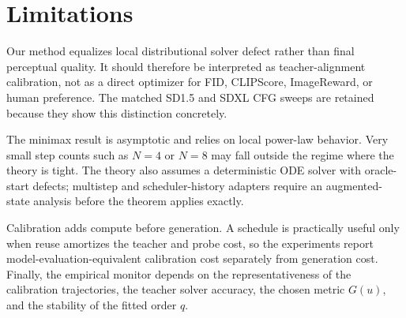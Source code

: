 \section{Limitations}
\label{sec:limitations}

Our method equalizes local distributional solver defect rather than final
perceptual quality. It should therefore be interpreted as
teacher-alignment calibration, not as a direct optimizer for FID, CLIPScore,
ImageReward, or human preference. The matched SD1.5 and SDXL CFG sweeps are
retained because they show this distinction concretely.

The minimax result is asymptotic and relies on local power-law behavior. Very
small step counts such as $N=4$ or $N=8$ may fall outside the regime where the
theory is tight. The theory also assumes a deterministic ODE solver with
oracle-start defects; multistep and scheduler-history adapters require an
augmented-state analysis before the theorem applies exactly.

Calibration adds compute before generation. A schedule is practically useful
only when reuse amortizes the teacher and probe cost, so the experiments report
model-evaluation-equivalent calibration cost separately from generation cost.
Finally, the empirical monitor depends on the representativeness of the
calibration trajectories, the teacher solver accuracy, the chosen metric
$G(u)$, and the stability of the fitted order $q$.
